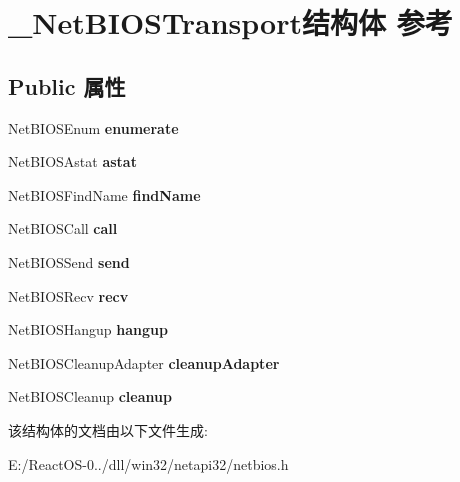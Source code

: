\hypertarget{struct___net_b_i_o_s_transport}{}\section{\+\_\+\+Net\+B\+I\+O\+S\+Transport结构体 参考}
\label{struct___net_b_i_o_s_transport}
\subsection*{Public 属性}
\begin{DoxyCompactItemize}
\item 
\mbox{\label{struct___net_b_i_o_s_transport_a89c62794a8cbac92b7f52c395c8be178}} 
Net\+B\+I\+O\+S\+Enum {\bfseries enumerate}
\item 
\mbox{\label{struct___net_b_i_o_s_transport_a5f42d71157e2d7f313ef69f552b987d2}} 
Net\+B\+I\+O\+S\+Astat {\bfseries astat}
\item 
\mbox{\label{struct___net_b_i_o_s_transport_a16e65f333db8077d2eff0cb9eed4a0bb}} 
Net\+B\+I\+O\+S\+Find\+Name {\bfseries find\+Name}
\item 
\mbox{\label{struct___net_b_i_o_s_transport_a1ade708481e6f7ebadf6cf53cce265a8}} 
Net\+B\+I\+O\+S\+Call {\bfseries call}
\item 
\mbox{\label{struct___net_b_i_o_s_transport_a21c8d0b7de6083d4d9a5297bcfcf5b97}} 
Net\+B\+I\+O\+S\+Send {\bfseries send}
\item 
\mbox{\label{struct___net_b_i_o_s_transport_a43a13758dfb9916f34f4a1dcf51c47fc}} 
Net\+B\+I\+O\+S\+Recv {\bfseries recv}
\item 
\mbox{\label{struct___net_b_i_o_s_transport_a526357f3b7f30a37c3bf52521b7f4818}} 
Net\+B\+I\+O\+S\+Hangup {\bfseries hangup}
\item 
\mbox{\label{struct___net_b_i_o_s_transport_abd86107348b6dede3ca5fe9bfc5cca3c}} 
Net\+B\+I\+O\+S\+Cleanup\+Adapter {\bfseries cleanup\+Adapter}
\item 
\mbox{\label{struct___net_b_i_o_s_transport_af78e99496b8d06ece6598776e52aa030}} 
Net\+B\+I\+O\+S\+Cleanup {\bfseries cleanup}
\end{DoxyCompactItemize}


该结构体的文档由以下文件生成\+:\begin{DoxyCompactItemize}
\item 
E\+:/\+React\+O\+S-\/0../dll/win32/netapi32/netbios.\+h\end{DoxyCompactItemize}
